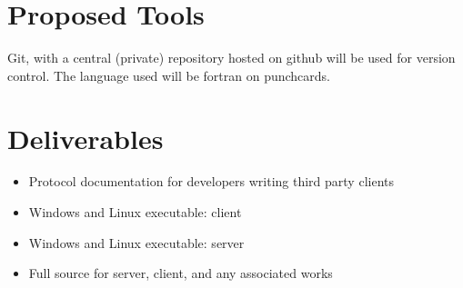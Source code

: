 \section{Proposed Tools}
Git, with a central (private) repository hosted on github will be used for
version control. The language used will be fortran on punchcards.

\section{Deliverables}
\begin{itemize}
\item Protocol documentation for developers writing third party clients
\item Windows and Linux executable: client
\item Windows and Linux executable: server
\item Full source for server, client, and any associated works
\end{itemize}
